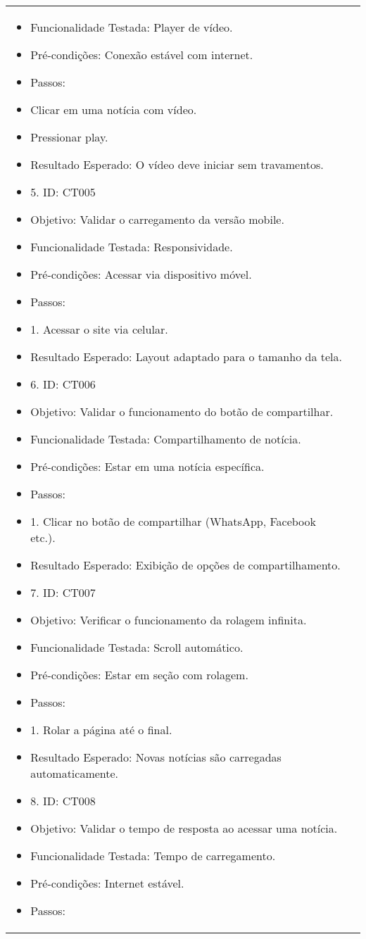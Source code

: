 \documentclass[12pt]{article}
\begin{document}
\begin{tabular}{|>{\bfseries}p{4cm}|p{10cm}|}
\begin{itemize}
\item Funcionalidade Testada: Player de vídeo.
\item Pré-condições: Conexão estável com internet.
\item Passos:
\item Clicar em uma notícia com vídeo.
\item Pressionar play.
\item Resultado Esperado: O vídeo deve iniciar sem travamentos.
\item 5. ID: CT005
\item Objetivo: Validar o carregamento da versão mobile.
\item Funcionalidade Testada: Responsividade.
\item Pré-condições: Acessar via dispositivo móvel.
\item Passos:
\item 1. Acessar o site via celular.
\item Resultado Esperado: Layout adaptado para o tamanho da tela.
\item 6. ID: CT006
\item Objetivo: Validar o funcionamento do botão de compartilhar.
\item Funcionalidade Testada: Compartilhamento de notícia.
\item Pré-condições: Estar em uma notícia específica.
\item Passos:
\item 1. Clicar no botão de compartilhar (WhatsApp, Facebook etc.).
\item Resultado Esperado: Exibição de opções de compartilhamento.
\item 7. ID: CT007
\item Objetivo: Verificar o funcionamento da rolagem infinita.
\item Funcionalidade Testada: Scroll automático.
\item Pré-condições: Estar em seção com rolagem.
\item Passos:
\item 1. Rolar a página até o final.
\item Resultado Esperado: Novas notícias são carregadas automaticamente.
\item 8. ID: CT008
\item Objetivo: Validar o tempo de resposta ao acessar uma notícia.
\item Funcionalidade Testada: Tempo de carregamento.
\item Pré-condições: Internet estável.
\item Passos:

\end{itemize}
\end{tabular}
\end{document}
